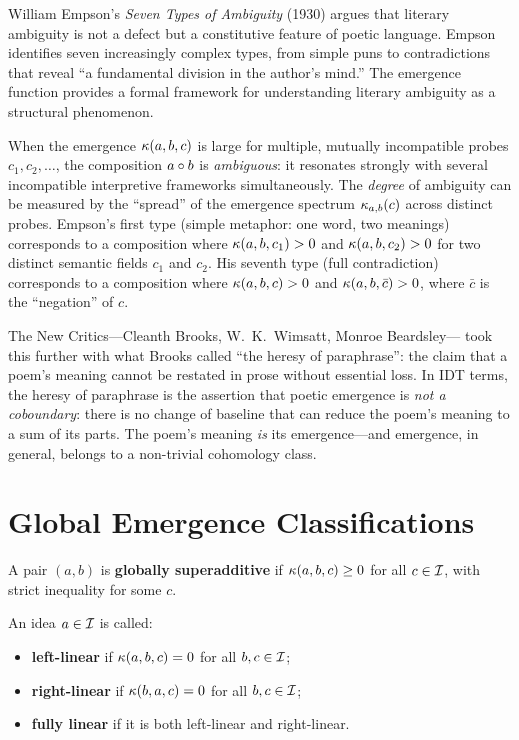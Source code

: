 \begin{interpretation}\label{interp:ch5:empson_ambiguity}
William Empson's \emph{Seven Types of Ambiguity} (1930) argues that literary
ambiguity is not a defect but a constitutive feature of poetic language.
Empson identifies seven increasingly complex types, from simple puns to
contradictions that reveal ``a fundamental division in the author's mind.''
The emergence function provides a formal framework for understanding
literary ambiguity as a structural phenomenon.

When the emergence $\kappa(a, b, c)$ is large for multiple, mutually
incompatible probes $c_1, c_2, \ldots$, the composition $a \circ b$
is \emph{ambiguous}: it resonates strongly with several incompatible
interpretive frameworks simultaneously. The \emph{degree} of ambiguity
can be measured by the ``spread'' of the emergence spectrum
$\kappa_{a,b}(c)$ across distinct probes. Empson's first type (simple
metaphor: one word, two meanings) corresponds to a composition where
$\kappa(a, b, c_1) > 0$ and $\kappa(a, b, c_2) > 0$ for two distinct
semantic fields $c_1$ and $c_2$. His seventh type (full contradiction)
corresponds to a composition where $\kappa(a, b, c) > 0$ and
$\kappa(a, b, \bar{c}) > 0$, where $\bar{c}$ is the ``negation'' of $c$.

The New Critics---Cleanth Brooks, W.~K.~Wimsatt, Monroe Beardsley---
took this further with what Brooks called ``the heresy of paraphrase'':
the claim that a poem's meaning cannot be restated in prose without
essential loss. In IDT terms, the heresy of paraphrase is the assertion
that poetic emergence is \emph{not a coboundary}: there is no change of
baseline that can reduce the poem's meaning to a sum of its parts.
The poem's meaning \emph{is} its emergence---and emergence, in general,
belongs to a non-trivial cohomology class.
\end{interpretation}

\section{Global Emergence Classifications}

\begin{definition}
A pair $(a, b)$ is \textbf{globally superadditive} if $\kappa(a,b,c) \geq
0$ for all $c \in \mathcal{I}$, with strict inequality for some $c$.
\end{definition}

\begin{definition}[Linearity]\label{def:linearity}
An idea $a \in \mathcal{I}$ is called:
\begin{itemize}
    \item \textbf{left-linear} if $\kappa(a, b, c) = 0$ for all
          $b, c \in \mathcal{I}$;
    \item \textbf{right-linear} if $\kappa(b, a, c) = 0$ for all
          $b, c \in \mathcal{I}$;
    \item \textbf{fully linear} if it is both left-linear and right-linear.
\end{itemize}
\end{definition}

